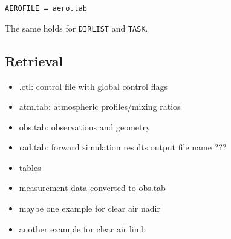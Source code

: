 \texttt{AEROFILE = aero.tab}

The same holds for \texttt{DIRLIST} and \texttt{TASK}.




\subsection{Retrieval}
\begin{itemize}
\item \*.ctl: control file with global control flags
\item atm.tab: atmospheric profiles/mixing ratios
\item obs.tab: observations and geometry
\item rad.tab: forward simulation results output file name ???
\item tables
\item measurement data converted to obs.tab
\item maybe one example for clear air nadir
\item another example for clear air limb
\end{itemize}